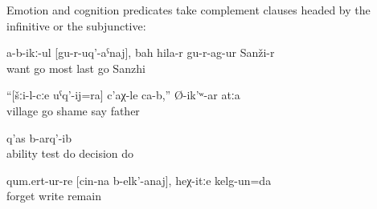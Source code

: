 Emotion and cognition predicates take complement clauses headed by the infinitive or the subjunctive:
%
\begin{exe}
	\ex	\label{ex:‎Not wanting to leave, he left Sanzhi as the very last}
	\gll	a-b-ikː-ul	[gu-r-uq'-aˁnaj],	bah	hila-r	gu-r-ag-ur	Sanži-r\\
		want	go	most	last	go	Sanzhi\\
	\glt	{}

	\ex	\label{ex:(I) am ashamed to go to the village, said the father}
	\gll	``[šːi-l-cːe	uˁq'-ij=ra]	c'aχ-le	ca-b,''	Ø-ik'ʷ-ar	atːa\\
		village	go	shame		say	father\\
	\glt	{}

	\ex	\label{ex:They decided to test their ability}
		q'as	b-arq'-ib\\
			ability	test	do	decision	do\\
	\glt	{}

	\ex	\label{ex:‎He forgot to write and I remained like this}
	\gll	qum.ert-ur-re	[cin-na	b-elk'-anaj],	heχ-itːe	kelg-un=da\\
		forget		write		remain\\
	\glt	{}
\end{exe}

